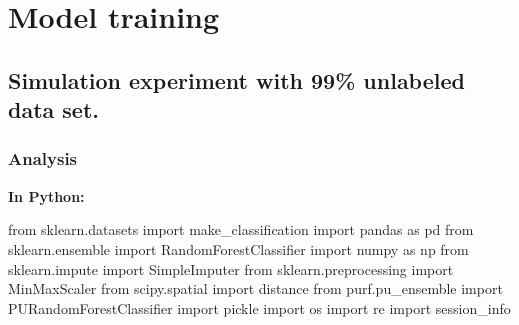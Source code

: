 \documentclass[
  11pt,
  oneside]{book}
\newenvironment{Shaded}{\begin{snugshade}}{\end{snugshade}}
\newcommand{\ImportTok}[1]{#1}
\newcommand{\NormalTok}[1]{#1}
\begin{document}
\hypertarget{02_model_training}{%
\chapter{Model training}\label{02_model_training}}

\hypertarget{simulation-experiment-with-99-unlabeled-data-set.}{%
\section{Simulation experiment with 99\% unlabeled data set.}\label{simulation-experiment-with-99-unlabeled-data-set.}}

\hypertarget{analysis}{%
\subsection{Analysis}\label{analysis}}

\textbf{In Python: }

\begin{Shaded}
\begin{Highlighting}[]
\ImportTok{from}\NormalTok{ sklearn.datasets }\ImportTok{import}\NormalTok{ make\_classification}
\ImportTok{import}\NormalTok{ pandas }\ImportTok{as}\NormalTok{ pd}
\ImportTok{from}\NormalTok{ sklearn.ensemble }\ImportTok{import}\NormalTok{ RandomForestClassifier}
\ImportTok{import}\NormalTok{ numpy }\ImportTok{as}\NormalTok{ np}
\ImportTok{from}\NormalTok{ sklearn.impute }\ImportTok{import}\NormalTok{ SimpleImputer}
\ImportTok{from}\NormalTok{ sklearn.preprocessing }\ImportTok{import}\NormalTok{ MinMaxScaler}
\ImportTok{from}\NormalTok{ scipy.spatial }\ImportTok{import}\NormalTok{ distance}
\ImportTok{from}\NormalTok{ purf.pu\_ensemble }\ImportTok{import}\NormalTok{ PURandomForestClassifier}
\ImportTok{import}\NormalTok{ pickle}
\ImportTok{import}\NormalTok{ os}
\ImportTok{import}\NormalTok{ re}
\ImportTok{import}\NormalTok{ session\_info}
\end{Highlighting}
\end{Shaded}
\end{document}
